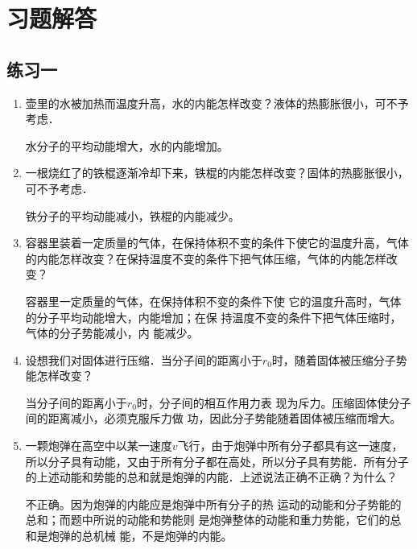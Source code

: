 \section{习题解答}

\subsection{练习一}

\begin{enumerate}
	\item 壶里的水被加热而温度升高，水的内能怎样改变？液体的热膨胀很小，可不予考虑．
	
\begin{solution}
    水分子的平均动能增大，水的内能增加。
\end{solution}    
\item 一根烧红了的铁棍逐渐冷却下来，铁棍的内能怎样改变？固体的热膨胀很小，可不予考虑．
	
\begin{solution}
    铁分子的平均动能减小，铁棍的内能减少。
\end{solution}    
\item 容器里装着一定质量的气体，在保持体积不变的条件下使它的温度升高，气体的内能怎样改变？在保持温度不变的条件下把气体压缩，气体的内能怎样改变？
	
\begin{solution}
    容器里一定质量的气体，在保持体积不变的条件下使
它的温度升高时，气体的分子平均动能增大，内能增加；在保
持温度不变的条件下把气体压缩时，气体的分子势能减小，内
能减少。
\end{solution}    
\item 设想我们对固体进行压缩．当分子间的距离小于$r_0$时，随着固体被压缩分子势能怎样改变？
	
\begin{solution}
    当分子间的距离小于$r_0$时，分子间的相互作用力表
现为斥力。压缩固体使分子间的距离减小，必须克服斥力做
功，因此分子势能随着固体被压缩而增大。
\end{solution}    
\item 一颗炮弹在高空中以某一速度$v$飞行，由于炮弹中所有分子都具有这一速度，所以分子具有动能，又由于所有分子都在高处，所以分子具有势能．所有分子的上述动能和势能的总和就是炮弹的内能．上述说法正确不正确？为什么？
	
\begin{solution}
    不正确。因为炮弹的内能应是炮弹中所有分子的热
运动的动能和分子势能的总和；而题中所说的动能和势能则
是炮弹整体的动能和重力势能，它们的总和是炮弹的总机械
能，不是炮弹的内能。
\end{solution}    
\end{enumerate}

